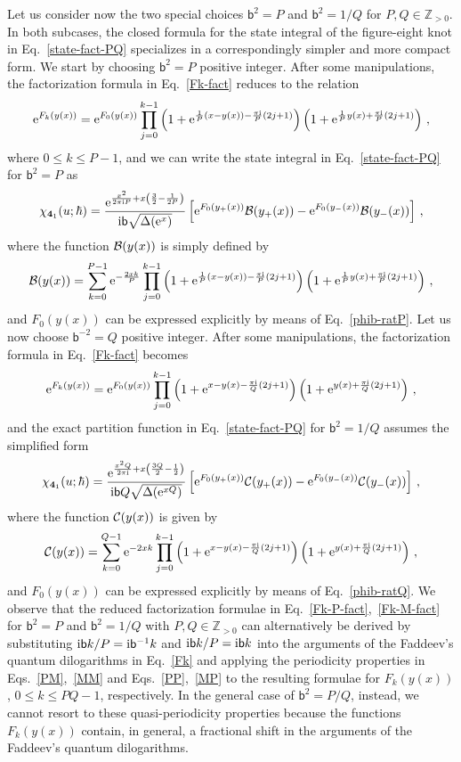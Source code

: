 \documentclass[a4paper,11pt]{article}
\theoremstyle{definition}
\newcommand{\CB}{{\cal B}}
\newcommand{\CC}{{\cal C}}
\def\IZ{{\mathbb Z}}
\def\FE{\bm{4}_1}
\newcommand{\re}{{\rm e}}
\newcommand{\ri}{{\rm i}}
\newcommand{\mb}{{\mathsf{b}}}
\newcommand{\be}{\begin{equation}}
\newcommand{\ee}{\end{equation}}
\begin{document}
Let us consider now the two special choices $\mb^2 = P$ and $\mb^2 = 1/Q$ for $P, Q \in \IZ_{>0}$. In both subcases, the closed formula for the state integral of the figure-eight knot in Eq.~\eqref{state-fact-PQ} specializes in a correspondingly simpler and more compact form. 
%
We start by choosing $\mb^2= P$ positive integer. After some manipulations, the factorization formula in Eq.~\eqref{Fk-fact} reduces to the relation
\be \label{Fk-P-fact}
\re^{F_k(y(x))} = \re^{F_0(y(x))} \prod_{j=0}^{k-1} \left(1 + \re^{\frac{1}{P}(x-y(x))-\frac{\pi \ri}{P} (2j+1)} \right) \left(1 + \re^{\frac{1}{P}y(x)+\frac{\pi \ri}{P} (2j+1)} \right) \, , 
\ee
where $0 \le k \le P -1$, and we can write the state integral in Eq.~\eqref{state-fact-PQ} for $\mb^2=P$ as
\be \label{state-fact-P}
\chi_{\FE}(u;\hbar) = \frac{\re^{\frac{x^2}{2 \pi \ri P}+x\left( \frac{3}{2}-\frac{1}{2 P}\right)} }{\ri \mb \sqrt{\Delta(\re^x)}} \left[ \re^{F_0(y_+(x))} \CB(y_+(x)) - \re^{F_0(y_-(x))} \CB(y_-(x)) \right] \, ,
\ee
where the function $\CB(y(x))$ is simply defined by
\be
\CB(y(x)) = \sum_{k=0}^{P - 1}  \re^{-\frac{2 x k}{P}} \prod_{j=0}^{k-1} \left(1 + \re^{\frac{1}{P}(x-y(x))-\frac{\pi \ri}{P} (2j+1)} \right) \left(1 + \re^{\frac{1}{P}y(x)+\frac{\pi \ri}{P} (2j+1)} \right) \, ,
\ee
and $F_0(y(x))$ can be expressed explicitly by means of Eq.~\eqref{phib-ratP}. 
Let us now choose $\mb^{-2}= Q$ positive integer. After some manipulations, the factorization formula in Eq.~\eqref{Fk-fact} becomes
\be \label{Fk-M-fact}
\re^{F_k(y(x))} = \re^{F_0(y(x))} \prod_{j=0}^{k-1} \left(1 + \re^{x-y(x)-\frac{\pi \ri}{Q} (2j+1)} \right) \left(1 + \re^{y(x)+\frac{\pi \ri}{Q} (2j+1)} \right) \, ,
\ee
and the exact partition function in Eq.~\eqref{state-fact-PQ} for $\mb^2=1/Q$ assumes the simplified form
\be \label{state-fact-M}
\chi_{\FE}(u;\hbar) = \frac{\re^{\frac{x^2 Q}{2 \pi \ri}+x\left( \frac{3 Q}{2} -\frac{1}{2} \right)} }{\ri \mb Q \sqrt{\Delta(\re^{x Q})}} \left[ \re^{F_0(y_+(x))} \CC(y_+(x)) - \re^{F_0(y_-(x))} \CC(y_-(x)) \right] \, ,
\ee
where the function $\CC(y(x))$ is given by
\be
\CC(y(x)) = \sum_{k=0}^{Q - 1}  \re^{-2 x k} \prod_{j=0}^{k-1} \left(1 + \re^{x-y(x)-\frac{\pi \ri}{Q} (2j+1)} \right) \left(1 + \re^{y(x)+\frac{\pi \ri}{Q} (2j+1)} \right) \, ,
\ee
and $F_0(y(x))$ can be expressed explicitly by means of  Eq.~\eqref{phib-ratQ}. 
We observe that the reduced factorization formulae in Eq.~\eqref{Fk-P-fact},~\eqref{Fk-M-fact} for $\mb^2 = P$ and $\mb^2 = 1/Q$ with $P, Q \in \IZ_{>0}$ can alternatively be derived by substituting $\ri \mb k / P = \ri \mb^{-1} k$ and $\ri \mb k / P = \ri \mb k$ into the arguments of the Faddeev's quantum dilogarithms in Eq.~\eqref{Fk} and applying the periodicity properties in Eqs.~\eqref{PM},~\eqref{MM} and Eqs.~\eqref{PP},~\eqref{MP} to the resulting formulae for $F_k(y(x))$, $0 \le k \le PQ-1$, respectively. In the general case of $\mb^2 = P/Q$, instead, we cannot resort to these quasi-periodicity properties because the functions $F_k(y(x))$ contain, in general, a fractional shift in the arguments of the Faddeev's quantum dilogarithms. 
\end{document}
